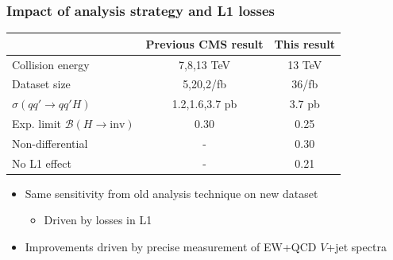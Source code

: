 \documentclass[aspectratio=169,xcolor=dvipsnames,,table,compress]{beamer}
\begin{document}
\begin{frame}[t] \frametitle{Impact of analysis strategy and L1 losses}
  \centering 
  \vspace{7mm}
  \begin{tabular}{l|c|c} 
    & Previous CMS result & This result \\ 
    \hline \hline 
    Collision energy & 7,8,13 TeV & 13 TeV \\ 
    Dataset size & 5,20,2/fb & 36/fb\\ 
    $\sigma(qq'\rightarrow qq'H)$ & 1.2,1.6,3.7 pb & 3.7 pb  \\ 
    \hline
    Exp. limit $\mathcal{B}(H\rightarrow\mathrm{inv})$ & 0.30 & 0.25  \\ 
    \hline 
    Non-differential & - & 0.30 \\ 
    No L1 effect & - & 0.21 \\
  \end{tabular}
  \vspace{3mm}
  \begin{itemize}
    \item Same sensitivity from old analysis technique on new dataset 
      \begin{itemize}
        \item Driven by losses in L1 
      \end{itemize}
    \item Improvements driven by precise measurement of EW+QCD $V$+jet spectra
  \end{itemize}
\end{frame}
\end{document}
